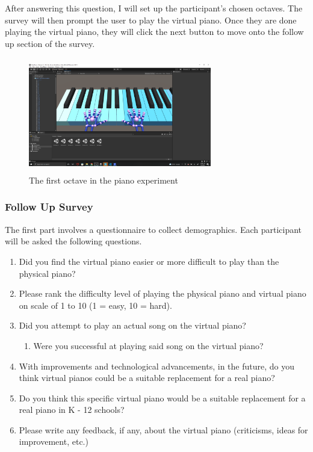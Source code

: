 \documentclass[sigconf,authordraft]{acmart}
\begin{document}
After answering this question, I will set up the participant's chosen octaves.  The survey will then prompt the user to play the virtual piano.  Once they are done playing the virtual piano, they will click the next button to move onto the follow up section of the survey.

\begin{figure}[h]
\centering
\includegraphics[width=8cm, height=5cm]{Octave1.png}
\centering
\caption{The first octave in the piano experiment}
\end{figure}

\subsubsection{Follow Up Survey}
The first part involves a questionnaire to collect demographics.  Each participant will be asked the following questions.
\begin{enumerate}
 \item Did you find the virtual piano easier or more difficult to play than the physical piano?
 \item Please rank the difficulty level of playing the physical piano and virtual piano on scale of 1 to 10 (1 = easy, 10 = hard).
 \item Did you attempt to play an actual song on the virtual piano?
 \begin{enumerate}
 \item Were you successful at playing said song on the virtual piano?
 \end{enumerate}
 \item With improvements and technological advancements, in the future, do you think virtual pianos could be a suitable replacement for a real piano?
 \item Do you think this specific virtual piano would be a suitable replacement for a real piano in K - 12 schools?
 \item Please write any feedback, if any, about the virtual piano (criticisms, ideas for improvement, etc.)
\end{enumerate}
\end{document}
